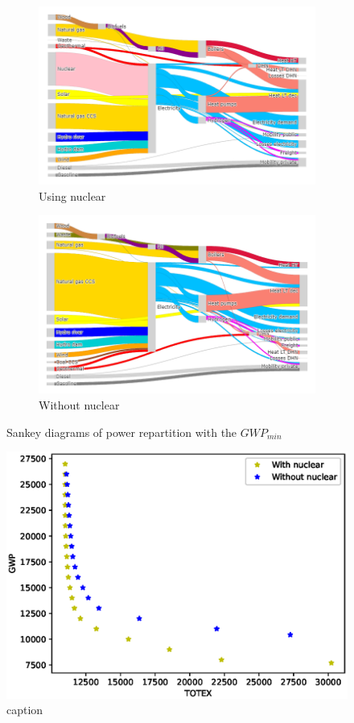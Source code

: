 \documentclass[12pt, a4paper ]{article}
\begin{document}
\begin{figure}[H]
    \centering
    \begin{subfigure}[b]{0.45\textwidth}
        \centering
        \includegraphics[width=1\textwidth]{data/LOW_GWP_nuc.png}
        \caption{Using nuclear}
    \end{subfigure}
    \begin{subfigure}[b]{0.45\textwidth}
        \centering
        \includegraphics[width=1\textwidth]{data/LOW_GWP_wnuc.png}
        \caption{Without nuclear}
    \end{subfigure}
    \caption{Sankey diagrams of power repartition with the $GWP_{min}$}
    \label{fig:sankey1}
\end{figure}
\begin{figure}[H]
    \centering
    \includegraphics[width=.8\textwidth]{data/TOTEX_GWP.eps}
    \caption{caption}
    \label{fig:GWP_vs_TOTEX}
\end{figure}
\end{document}

